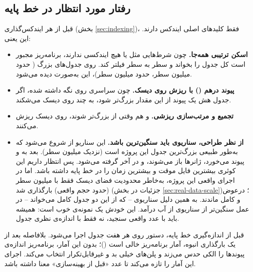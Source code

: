 \subsection{رفتار مورد انتظار در خط پایه}

قبل از هر ایندکس‌گذاری (بخش \ref{sec:indexing})، فقط کلیدهای اصلی ایندکس دارند. این یعنی:

\begin{itemize}
\item \textbf{اسکن ترتیبی همه‌جا.} چون شرط‌هایی مثل  یا  هیچ ایندکسی ندارند، برنامه‌ریز مجبور است کل جدول را بخواند و سطر به سطر فیلتر کند. روی جدول‌های بزرگ ( حدود  میلیون سطر،  حدود  میلیون سطر)، این به‌صورت  دیده می‌شود.
\item \textbf{پیوند درهم () با ریزش روی دیسک.} چون  سراسری روی  نگه داشته شده، اگر جدول هش یک پیوند از این مقدار بزرگ‌تر شود، به چند  روی دیسک می‌شکند.
\item \textbf{تجمیع و مرتب‌سازی ریزشی.}  و  هم وقتی از  بزرگ‌تر شوند، روی دیسک ریزش می‌کنند.
\item \textbf{از نظر طراحی، سناریوی  باید سنگین‌ترین باشد.} این سناریو از  شروع می‌شود که به‌طور طبیعی بزرگ‌ترین جدول این پروژه است (نزدیک  میلیون سطر). بعد به  و  پیوند می‌خورد، ژانرها باز می‌شوند، و در آخر  گرفته می‌شود. پس انتظار داریم این کوئری بیشترین فایل موقت و بیشترین زمان را در خط پایه داشته باشد. اما در اجرای واقعی این پروژه،  به‌خاطر محدودیت فضای دیسک فقط با  میلیون سطر (حدود  حجم واقعی) بارگذاری شد (جزئیات در بخش \ref{sec:real-data-scale})؛ درعوض  و  کامل ماندند. به همین دلیل سناریوی  -- که از این دو جدول کامل می‌خواند -- در عمل سنگین‌تر از سناریوی  از آب درآمد. این خودش یک نمونه‌ی خوب است: همیشه باید با عدد واقعی سنجید، نه فقط با اندازه‌ی نظری جدول.
\end{itemize}

قبل از اندازه‌گیری خط پایه، دستور  روی هر هفت جدول اجرا می‌شود. بلافاصله بعد از یک بارگذاری انبوه، آمار برنامه‌ریز خالی است ()؛ بدون این آمار، برنامه‌ریز اندازه‌ی پیوندها را الکی حدس می‌زند و پلن‌های خیلی بد و غیرقابل‌تکرار انتخاب می‌کند. اجرای  این آمار را تازه می‌کند تا عدد «قبل از بهینه‌سازی» معنا داشته باشد.

